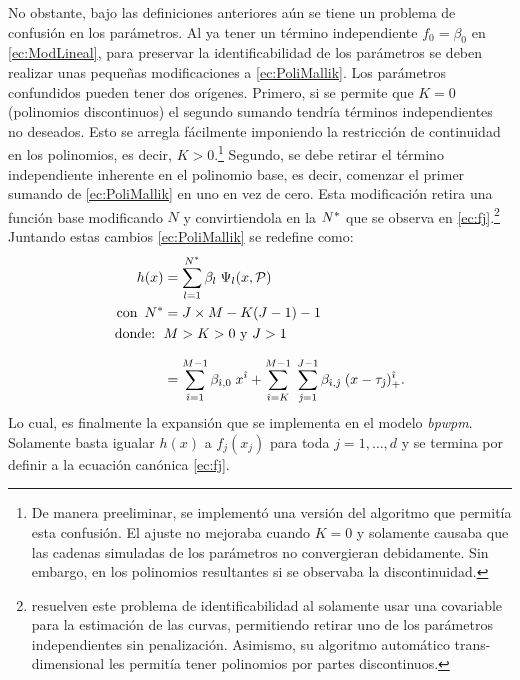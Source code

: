 \documentclass[../Main/Main.tex]{subfiles}
\begin{document}
No obstante, bajo las definiciones anteriores aún se tiene un problema de confusión en los parámetros. Al ya tener un término independiente $f_0 = \beta_0$ en \eqref{ec:ModLineal}, para preservar la identificabilidad de los parámetros se deben realizar unas pequeñas modificaciones a \eqref{ec:PoliMallik}. Los parámetros confundidos pueden tener dos orígenes. Primero, si se permite que $K = 0$ (polinomios discontinuos) el segundo sumando tendría términos independientes no deseados. Esto se arregla fácilmente imponiendo la restricción de continuidad en los polinomios, es decir, $K > 0$.\footnote{De manera preeliminar, se implementó una versión del algoritmo que permitía esta confusión. El ajuste no mejoraba cuando $K = 0$ y solamente causaba que las cadenas simuladas de los parámetros no convergieran debidamente. Sin embargo, en los polinomios resultantes si se observaba la discontinuidad.} Segundo, se debe retirar el término independiente inherente en el polinomio base, es decir, comenzar el primer sumando de \eqref{ec:PoliMallik} en uno en vez de cero. Esta modificación retira una función base modificando $N$ y convirtiendola en la $N^*$ que se observa en \eqref{ec:fj}.\footnote{\citeauthor{mallik1998automatic} resuelven este problema de identificabilidad al solamente usar una covariable para la estimación de las curvas, permitiendo retirar uno de los parámetros independientes sin penalización. Asimismo, su algoritmo automático trans-dimensional les permitía tener polinomios por partes discontinuos.} Juntando estas cambios \eqref{ec:PoliMallik} se redefine como:
\begin{align}
	h(x) &= \sum_{l = 1}^{N^*} \beta_l \; \Psi_l(x,\mathcal{P}) \nonumber\\ 
	\text{con } \, N^* &= J\times M - K(J-1) - 1\nonumber \\
	\text{donde: } \, & M > K > 0 \text{ y } J > 1 \nonumber \\[7pt]
 		 &=	\sum_{\hat{\imath} = 1}^{M - 1} \beta_{\hat{\imath},0} \; x^{\hat{\imath}} + 
		\sum_{\hat{\imath} = K}^{M-1} \;
	 		\sum_{\hat{\jmath} = 1}^{J-1}\beta_{\hat{\imath},\hat{\jmath}}\;(x - \tau_{\hat{\jmath}})_+^{\hat{\imath}}.
	 			\label{ec:PoliFinal}
\end{align}
Lo cual, es finalmente la expansión que se implementa en el modelo \textit{bpwpm}. Solamente basta igualar $h(x)$ a $f_j(x_j)$ para toda $j = 1,\ldots,d$ y se termina por definir a la ecuación canónica \eqref{ec:fj}.
\end{document}
